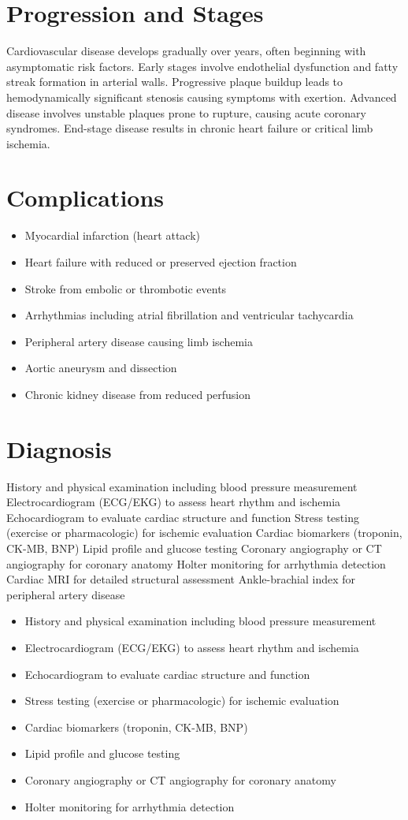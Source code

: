 \section{Progression and Stages}
Cardiovascular disease develops gradually over years, often beginning with asymptomatic risk factors. Early stages involve endothelial dysfunction and fatty streak formation in arterial walls. Progressive plaque buildup leads to hemodynamically significant stenosis causing symptoms with exertion. Advanced disease involves unstable plaques prone to rupture, causing acute coronary syndromes. End-stage disease results in chronic heart failure or critical limb ischemia.
\section{Complications}
\begin{itemize}[noitemsep]
  \item Myocardial infarction (heart attack)
  \item Heart failure with reduced or preserved ejection fraction
  \item Stroke from embolic or thrombotic events
  \item Arrhythmias including atrial fibrillation and ventricular tachycardia
  \item Peripheral artery disease causing limb ischemia
  \item Aortic aneurysm and dissection
  \item Chronic kidney disease from reduced perfusion
\end{itemize}
\section{Diagnosis}
History and physical examination including blood pressure measurement Electrocardiogram (ECG/EKG) to assess heart rhythm and ischemia Echocardiogram to evaluate cardiac structure and function Stress testing (exercise or pharmacologic) for ischemic evaluation Cardiac biomarkers (troponin, CK-MB, BNP) Lipid profile and glucose testing Coronary angiography or CT angiography for coronary anatomy Holter monitoring for arrhythmia detection Cardiac MRI for detailed structural assessment Ankle-brachial index for peripheral artery disease

\begin{itemize}[noitemsep]
  \item History and physical examination including blood pressure measurement
  \item Electrocardiogram (ECG/EKG) to assess heart rhythm and ischemia
  \item Echocardiogram to evaluate cardiac structure and function
  \item Stress testing (exercise or pharmacologic) for ischemic evaluation
  \item Cardiac biomarkers (troponin, CK-MB, BNP)
  \item Lipid profile and glucose testing
  \item Coronary angiography or CT angiography for coronary anatomy
  \item Holter monitoring for arrhythmia detection
\end{itemize}
